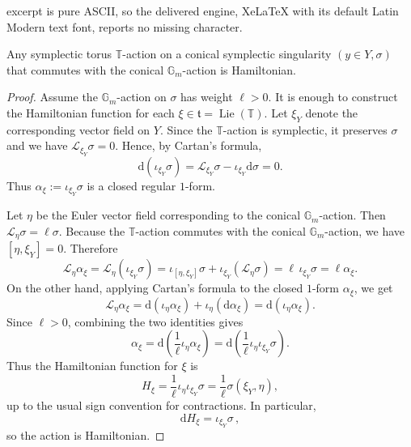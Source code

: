 \documentclass[10pt,a4paper]{amsart}
\newcommand{\bG}{\mathbb{G}}
\newcommand{\bT}{\mathbb{T}}
\newcommand{\cL}{\mathcal{L}}
\newcommand{\rd}{\mathrm{d}}
\begin{document}
excerpt is pure ASCII, so the delivered engine, XeLaTeX with its default Latin Modern text font, reports no missing character.
\begin{lem}\label{l-Sym=Hamilton}
Any symplectic torus $\bT$-action on a conical symplectic singularity $(y\in Y,\sigma)$ that commutes with the conical $\bG_m$-action is Hamiltonian. 
\end{lem}

\begin{proof}
Assume the $\mathbb{G}_m$-action on $\sigma$ has weight $\ell>0$.
It is enough to construct the  Hamiltonian function for each
\(\xi\in\mathfrak t=\operatorname{Lie}(\mathbb T)\). Let $\xi_Y$ denote the corresponding vector field on $Y$. Since the $\mathbb T$-action is symplectic, it preserves $\sigma$ and we have $\mathcal L_{\xi_Y}\sigma=0$.
Hence, by Cartan's formula,
\[
\rd(\iota_{\xi_Y}\sigma)=\mathcal L_{\xi_Y}\sigma-\iota_{\xi_Y}\rd\sigma=0.
\]
Thus $\alpha_\xi:=\iota_{\xi_Y}\sigma$ is a closed regular \(1\)-form.

Let $\eta$ be the Euler vector field corresponding to the conical $\bG_m$-action. Then $\cL_{\eta}\sigma = \ell\sigma$. Because the $\mathbb T$-action commutes with the conical
\(\mathbb G_m\)-action, we have $ [\eta,\xi_Y]=0$. Therefore
\[
\mathcal L_\eta\alpha_\xi = \mathcal L_\eta(\iota_{\xi_Y}\sigma) = \iota_{[\eta,\xi_Y]}\sigma+\iota_{\xi_Y}(\mathcal L_\eta\sigma) = \ell\,\iota_{\xi_Y}\sigma =\ell\alpha_\xi .
\]
On the other hand, applying Cartan's formula to the closed \(1\)-form
\(\alpha_\xi\), we get
\[
\mathcal L_\eta\alpha_\xi
=
\rd(\iota_\eta \alpha_\xi)+\iota_\eta(\rd\alpha_\xi)
=
\rd(\iota_\eta\alpha_\xi).
\]
Since $\ell>0$, combining the two identities gives %
\[
\alpha_\xi
=
\rd\left(\frac{1}{\ell}\iota_\eta\alpha_\xi\right)
=
\rd\left(\frac{1}{\ell}\iota_\eta\iota_{\xi_Y}\sigma\right).
\]
Thus the Hamiltonian function for \(\xi\) is
\[
H_\xi
=
\frac{1}{\ell}\iota_\eta\iota_{\xi_Y}\sigma
=
\frac{1}{\ell}\sigma(\xi_Y,\eta),
\]
up to the usual sign convention for contractions. %
In particular,
\[
\rd H_\xi=\iota_{\xi_Y}\sigma \, ,
\]
so the action is Hamiltonian.
\end{proof}
\end{document}
